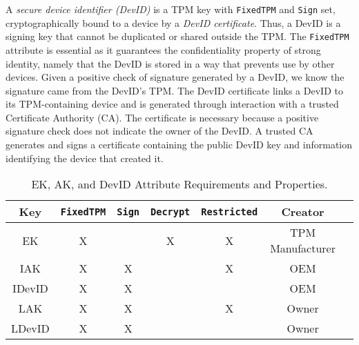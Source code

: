 \documentclass[runningheads]{llncs}
\begin{document}

A \emph{secure device identifier (DevID)} is a TPM key with
\verb|FixedTPM| and \verb|Sign| set, cryptographically bound to a
device by a \emph{DevID certificate}.  Thus, a DevID is a signing key that
cannot be duplicated or shared outside the TPM.  
The \verb|FixedTPM| attribute is essential as it guarantees the confidentiality property of
strong identity, namely that the DevID is stored in a way that prevents use by other
devices. Given a positive check of signature generated by a DevID, we know the signature
came from the DevID's TPM.
The DevID certificate links a DevID to its TPM-containing device and is generated through
interaction with a trusted Certificate Authority (CA).  The certificate is
necessary because a positive signature check does not indicate the
owner of the DevID.  A trusted CA generates and signs a certificate containing 
the public DevID key and information identifying the device that created it.

\begin{table}[hbtp]
  \begin{center}
    \footnotesize
    \begin{tabular}{ |c|c|c|c|c|c|c| }
      \hline
Key & \verb|FixedTPM| & \verb|Sign| & \verb|Decrypt| & \verb|Restricted| &
Creator \\
      \hline
      \hline
      EK & X &   & X & X & TPM Manufacturer \\
      \hline
      IAK & X & X &   & X & OEM   \\
      \hline
      IDevID & X & X &   &   & OEM   \\
      \hline
      LAK & X & X &   & X & Owner  \\
      \hline
      LDevID & X & X &   &   & Owner  \\
      \hline
    \end{tabular}
    \caption{EK, AK, and DevID Attribute Requirements and Properties.}
    \label{fig:req_and_recs}
  \end{center}
\end{table}
\end{document}
